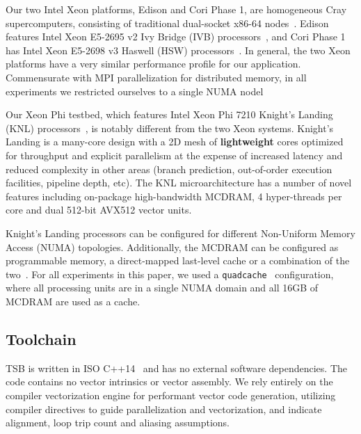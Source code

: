\documentclass[10pt, conference, compsocconf]{IEEEtran}
\begin{document}
Our two Intel Xeon platforms, Edison and Cori Phase 1, are homogeneous Cray
  supercomputers, consisting of traditional dual-socket x86-64
  nodes~\cite{nersc_systems}.
Edison features Intel Xeon E5-2695 v2 Ivy Bridge
  (IVB) processors~\cite{intel_ark_xeon_e5_2695_v2}, and Cori Phase 1 has Intel
  Xeon E5-2698 v3 Haswell (HSW) processors~\cite{intel_ark_xeon_e5_2698_v3}.
In general, the two Xeon platforms have a very similar performance profile for
  our application.
Commensurate with MPI parallelization for distributed memory, in all experiments
  we restricted ourselves to a single NUMA nodel

Our Xeon Phi testbed, which features Intel Xeon Phi 7210 Knight's Landing
  (KNL) processors~\cite{intel_ark_xeon_phi_7210}, is notably different from
  the two Xeon systems.
Knight's Landing is a many-core design with a 2D mesh of \textbf{lightweight}
  cores optimized for throughput and explicit parallelism at the expense of
  increased latency and reduced complexity in other areas (branch prediction,
  out-of-order execution facilities, pipeline depth, etc).
The KNL microarchitecture has a number of novel features including on-package
  high-bandwidth MCDRAM, 4 hyper-threads per core and dual 512-bit
  AVX512 vector units.~\cite{roofline_knl,knl_sodani}

Knight's Landing processors can be configured for different Non-Uniform Memory
  Access (NUMA) topologies.
Additionally, the MCDRAM can be configured as programmable memory, a
  direct-mapped last-level cache or a combination of the
  two~\cite{knl_sodani}.
For all experiments in this paper, we used a
  \lstinline{quadcache}~\cite{roofline_knl} configuration, where all processing
  units are in a single NUMA domain and all 16GB of MCDRAM are used as a cache.

\subsection{Toolchain}
\label{sec:setup:toolchain}

TSB is written in ISO C++14~\cite{cxx14_spec} and has no external software
  dependencies.
The code contains no vector intrinsics or vector assembly.
We rely entirely on the compiler vectorization engine for performant vector
  code generation, utilizing compiler directives to guide parallelization and
  vectorization, and indicate alignment, loop trip count and aliasing
  assumptions.
\end{document}
